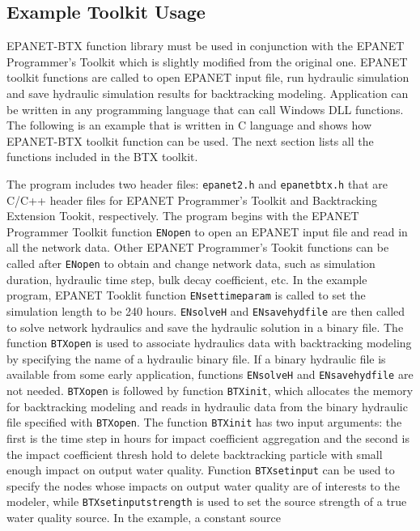\documentclass[12pt,letterpaper]{article}
\begin{document}
\subsection*{Example Toolkit Usage}
EPANET-BTX function library must be used in conjunction with the
EPANET Programmer's Toolkit which is slightly modified from the
original one. EPANET toolkit functions are called to open EPANET
input file, run hydraulic simulation and save hydraulic simulation
results for backtracking modeling. Application can be written in any
programming language that can call Windows DLL functions. The
following is an example that is written in C language and shows how
EPANET-BTX toolkit function can be used. The next section lists all
the functions included in the BTX toolkit.

The program includes two header files: \texttt{epanet2.h} and
\texttt{epanetbtx.h} that are C/C++ header files for EPANET
Programmer's Toolkit and Backtracking Extension Tookit,
respectively. The program begins with the EPANET Programmer Toolkit
function \texttt{ENopen} to open an EPANET input file and read in
all the network data. Other EPANET Programmer's Tookit functions can
be called after \texttt{ENopen} to obtain and change network data,
such as simulation duration, hydraulic time step, bulk decay
coefficient, etc. In the example program, EPANET Tooklit function
\texttt{ENsettimeparam} is called to set the simulation length to be
240 hours. \texttt{ENsolveH} and \texttt{ENsavehydfile} are then
called to solve network hydraulics and save the hydraulic solution
in a binary file. The function \texttt{BTXopen} is used to associate
hydraulics data with backtracking modeling by specifying the name of
a hydraulic binary file. If a binary hydraulic file is available
from some early application, functions \texttt{ENsolveH} and
\texttt{ENsavehydfile} are not needed. \texttt{BTXopen} is followed
by function \texttt{BTXinit}, which allocates the memory for
backtracking modeling and reads in hydraulic data from the binary
hydraulic file specified with \texttt{BTXopen}. The function
\texttt{BTXinit} has two input arguments: the first is the time step
in hours for impact coefficient aggregation and the second is the
impact coefficient thresh hold to delete backtracking particle with
small enough impact on output water quality. Function
\texttt{BTXsetinput} can be used to specify the nodes whose impacts
on output water quality are of interests to the modeler, while
\texttt{BTXsetinputstrength} is used to set the source strength of a
true water quality source. In the example, a constant source
\end{document}
